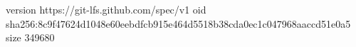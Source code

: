 version https://git-lfs.github.com/spec/v1
oid sha256:8c9f47624d1048e60eebdfcb915e464d5518b38cda0ec1c047968aaccd51e0a5
size 349680

